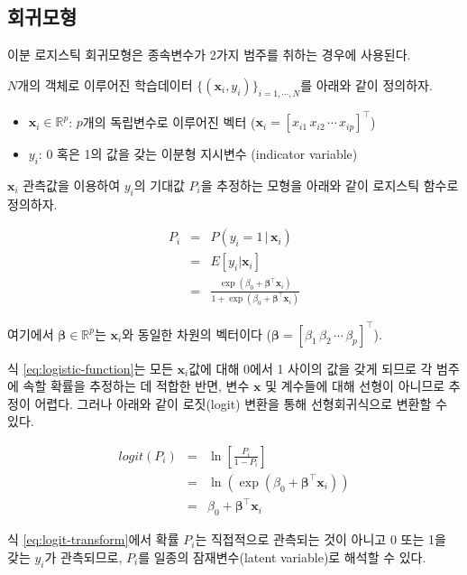 \documentclass[
]{book}
\providecommand{\tightlist}{%
  \setlength{\itemsep}{0pt}\setlength{\parskip}{0pt}}
\begin{document}
\hypertarget{binary-logistic-reg-model}{%
\subsection{회귀모형}\label{binary-logistic-reg-model}}

이분 로지스틱 회귀모형은 종속변수가 2가지 범주를 취하는 경우에 사용된다.

\(N\)개의 객체로 이루어진 학습데이터 \(\{(\mathbf{x}_i, y_i)\}_{i = 1, \cdots, N}\)를 아래와 같이 정의하자.

\begin{itemize}
\tightlist
\item
  \(\mathbf{x}_i \in \mathbb{R}^p\): \(p\)개의 독립변수로 이루어진 벡터 (\(\mathbf{x}_i = [x_{i1} \, x_{i2} \, \cdots \, x_{ip}]^\top\))
\item
  \(y_i\): 0 혹은 1의 값을 갖는 이분형 지시변수 (indicator variable)
\end{itemize}

\(\mathbf{x}_i\) 관측값을 이용하여 \(y_i\)의 기대값 \(P_i\)을 추정하는 모형을 아래와 같이 로지스틱 함수로 정의하자.

\begin{eqnarray}
P_i &=& P(y_i = 1 \,|\, \mathbf{x}_i)\\
&=& E[y_i | \mathbf{x}_i]\\ 
&=& \frac{\exp(\beta_0 + \boldsymbol\beta^\top \mathbf{x}_i)}{1 + \exp(\beta_0 + \boldsymbol\beta^\top \mathbf{x}_i)}
\label{eq:logistic-function}
\end{eqnarray}

여기에서 \(\boldsymbol\beta \in \mathbb{R}^{p}\)는 \(\mathbf{x}_i\)와 동일한 차원의 벡터이다 (\(\boldsymbol\beta = [\beta_1 \, \beta_2 \, \cdots \, \beta_p]^\top\)).

식 \eqref{eq:logistic-function}는 모든 \(\mathbf{x}_i\)값에 대해 0에서 1 사이의 값을 갖게 되므로 각 범주에 속할 확률을 추정하는 데 적합한 반면, 변수 \(\mathbf{x}\) 및 계수들에 대해 선형이 아니므로 추정이 어렵다. 그러나 아래와 같이 로짓(logit) 변환을 통해 선형회귀식으로 변환할 수 있다.

\begin{eqnarray}
logit(P_i) &=& \ln \left[ \frac{P_i}{1 - P_i} \right]\\
&=& \ln(\exp(\beta_0 + \boldsymbol\beta^\top \mathbf{x}_i))\\
&=& \beta_0 + \boldsymbol\beta^\top \mathbf{x}_i
\label{eq:logit-transform}
\end{eqnarray}

식 \eqref{eq:logit-transform}에서 확률 \(P_i\)는 직접적으로 관측되는 것이 아니고 0 또는 1을 갖는 \(y_i\)가 관측되므로, \(P_i\)를 일종의 잠재변수(latent variable)로 해석할 수 있다.
\end{document}
